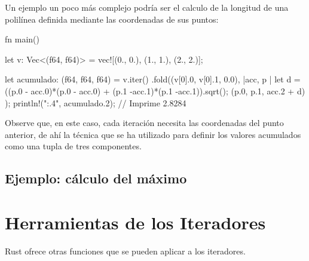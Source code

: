 Un ejemplo un poco más complejo podría ser el calculo de la longitud de una polilínea definida mediante las coordenadas de sus puntos:

\vspace{0.7em}
\begin{Codigo}
fn main() {
   let v: Vec<(f64, f64)> = vec![(0., 0.), (1., 1.), (2., 2.)];
   
   let acumulado: (f64, f64, f64) = v.iter()
      .fold((v[0].0, v[0].1, 0.0), |acc, p |{
         let d = ((p.0 - acc.0)*(p.0 - acc.0) + 
                  (p.1 -acc.1)*(p.1 -acc.1)).sqrt();
         (p.0, p.1, acc.2 + d)
      }
   );
   println!("{:.4}", acumulado.2); // Imprime 2.8284
}
\end{Codigo}

Observe que, en este caso, cada iteración necesita las coordenadas del punto anterior, de ahí la técnica que se ha utilizado para definir los valores acumulados como una tupla de tres componentes.




\subsection{Ejemplo: cálculo del máximo}


\section{Herramientas de los Iteradores}




Rust ofrece otras funciones que se pueden aplicar a los iteradores. 

